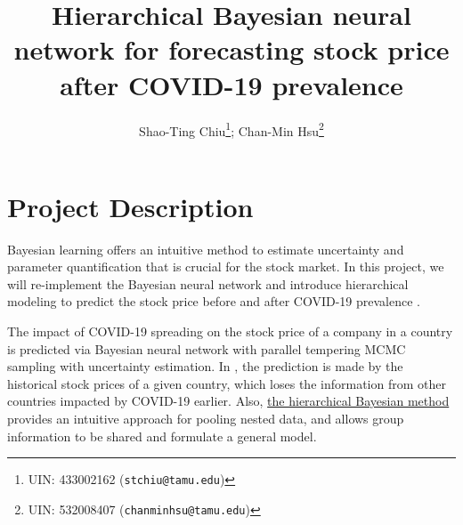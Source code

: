 \documentclass[a4paper]{article}
\title{Hierarchical Bayesian neural network for forecasting stock price after COVID-19 prevalence}
\author{%
  Shao-Ting Chiu\thanks{UIN: 433002162 (\texttt{stchiu@tamu.edu})}; 
  Chan-Min Hsu\thanks{UIN: 532008407 (\texttt{chanminhsu@tamu.edu})}
}
\begin{document}
\maketitle


\section{Project Description}




Bayesian learning offers an intuitive method to estimate uncertainty and parameter quantification that is crucial for the stock market.  In this project, we will re-implement the Bayesian neural network and introduce hierarchical modeling to predict the stock price before and after COVID-19 prevalence \cite{chandra2021bayesian}. 




The impact of COVID-19 spreading on the stock price of a company in a country is predicted via Bayesian neural network with parallel tempering MCMC sampling\cite{chandra2021bayesian, chandra2019langevin} with uncertainty estimation. In \cite{chandra2021bayesian}, the prediction is made by the historical stock prices of a given country, which loses the information from other countries impacted by COVID-19 earlier. Also,
\href{https://twiecki.io/blog/2018/08/13/hierarchical_bayesian_neural_network/}{the hierarchical Bayesian method} provides an intuitive approach for pooling nested data, and allows group information to be shared and formulate a general model. 
\end{document}
